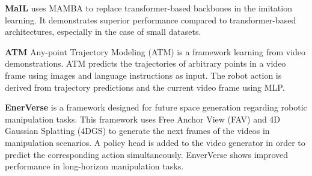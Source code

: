 \textbf{MaIL} \cite{jia2024mailimprovingimitationlearning} uses MAMBA to replace transformer-based backbones in the imitation learning. It demonstrates superior performance compared to transformer-based architectures, especially in the case of small datasets. 

\textbf{ATM} \cite{wen2024anypointtrajectorymodelingpolicy} Any-point Trajectory Modeling (ATM) is a framework learning from video demonstrations. ATM predicts the trajectories of arbitrary points in a video frame using images and language instructions as input. The robot action is derived from trajectory predictions and the current video frame using MLP. 

\textbf{EnerVerse} \cite{huang2025enerverseenvisioningembodiedfuture} is a framework designed for future space generation regarding robotic manipulation tasks. This framework uses Free Anchor View (FAV) and 4D Gaussian Splatting (4DGS) to generate the next frames of the videos in manipulation scenarios. A policy head is added to the video generator in order to predict the corresponding action simultaneously. EnverVerse shows improved performance in long-horizon manipulation tasks.
